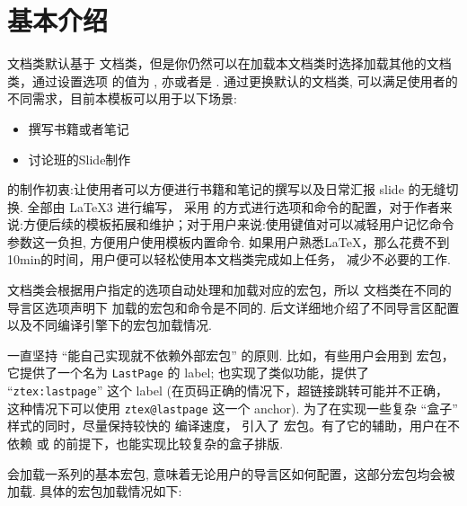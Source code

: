 \fancyheadoffset{0pt}


\section{基本介绍}
\ztex{} 文档类默认基于  文档类，但是你仍然可以在加载本文档类时选择加载其他的文档类，通过设置选项  的值为 
,  亦或者是 . 通过更换默认的文档类, \zTeX{} 可以满足使用者的不同需求，目前本模板可以用于以下场景:
\begin{itemize}
  \item 撰写书籍或者笔记
  \item 讨论班的Slide制作%
\end{itemize}

\ztex{} 的制作初衷:让使用者可以方便进行书籍和笔记的撰写以及日常汇报 slide 的无缝切换. \ztex{} 全部由 \LaTeX3 进行编写，
采用  的方式进行选项和命令的配置，对于作者来说:方便后续的模板拓展和维护；对于用户来说:使用键值对可以减轻用户记忆命令
参数这一负担, 方便用户使用模板内置命令. 如果用户熟悉\LaTeX{}，那么花费不到10min的时间，用户便可以轻松使用本文档类完成如上任务，
减少不必要的工作.

\ztex{} 文档类会根据用户指定的选项自动处理和加载对应的宏包，所以 \ztex{} 文档类在不同的导言区选项声明下
加载的宏包和命令是不同的. 后文详细地介绍了不同导言区配置以及不同编译引擎下的宏包加载情况. 

\ztex{} 一直坚持 ``能自己实现就不依赖外部宏包'' 的原则. 比如，有些用户会用到  宏包，
它提供了一个名为 \texttt{LastPage} 的 label; \ztex{} 也实现了类似功能，提供了 ``\texttt{ztex:lastpage}'' 
这个 label (在页码正确的情况下，超链接跳转可能并不正确，这种情况下可以使用 \texttt{ztex@lastpage} 这一个 anchor). 
为了在实现一些复杂 ``盒子'' 样式的同时，尽量保持较快的
编译速度，\ztex{} 引入了  宏包。有了它的辅助，用户在不依赖  或  
的前提下，也能实现比较复杂的盒子排版.

\ztex{} 会加载一系列的基本宏包, 意味着无论用户的导言区如何配置，这部分宏包均会被加载. 具体的宏包加载情况如下:

